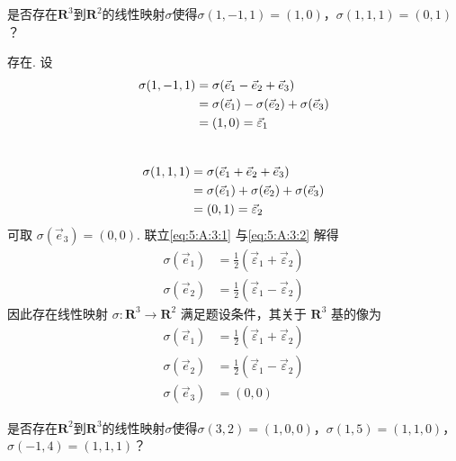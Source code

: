 \begin{exercise}
\begin{exgroup}
        \item 是否存在$\mathbf{R}^3$到$\mathbf{R}^2$的线性映射$\sigma$使得$\sigma(1,-1,1)=(1,0)$，$\sigma(1,1,1)=(0,1)$？

        \begin{answer}
            存在. 设
          \begin{align}
              \sigma(1, -1, 1) & = \sigma(\vec{e}_1 - \vec{e}_2 + \vec{e}_3) \notag                 \\
                               & = \sigma(\vec{e}_1) - \sigma(\vec{e}_2) + \sigma(\vec{e}_3) \notag \\
                               & = (1, 0) = \vec{\varepsilon}_1 \label{eq:5:A:3:1}
          \end{align} \\
          \begin{align}
              \sigma(1, 1, 1) & = \sigma(\vec{e}_1 + \vec{e}_2 + \vec{e}_3) \notag                 \\
                              & = \sigma(\vec{e}_1) + \sigma(\vec{e}_2) + \sigma(\vec{e}_3) \notag \\
                              & = (0, 1) = \vec{\varepsilon}_2 \label{eq:5:A:3:2}
          \end{align}
          可取 $ \sigma(\vec{e}_3) = (0, 0) $. 联立\autoref{eq:5:A:3:1} 与\autoref{eq:5:A:3:2} 解得
          \begin{align*}
              \sigma(\vec{e}_1) & = \frac{1}{2} (\vec{\varepsilon}_1 + \vec{\varepsilon}_2) \\
              \sigma(\vec{e}_2) & = \frac{1}{2} (\vec{\varepsilon}_1 - \vec{\varepsilon}_2)
          \end{align*}
          因此存在线性映射 $ \sigma : \mathbf{R}^3 \to \mathbf{R}^2 $ 满足题设条件，其关于 $ \mathbf{R}^3 $ 基的像为
          \begin{align*}
              \sigma(\vec{e}_1) & = \frac{1}{2} (\vec{\varepsilon}_1 + \vec{\varepsilon}_2) \\
              \sigma(\vec{e}_2) & = \frac{1}{2} (\vec{\varepsilon}_1 - \vec{\varepsilon}_2) \\
              \sigma(\vec{e}_3) & = (0, 0)
          \end{align*}

        \end{answer}

        \item 是否存在$\mathbf{R}^2$到$\mathbf{R}^3$的线性映射$\sigma$使得$\sigma(3,2)=(1,0,0)$，$\sigma(1,5)=(1,1,0)$，$\sigma(-1,4)=(1,1,1)$？


\end{exgroup}
\end{exercise}

